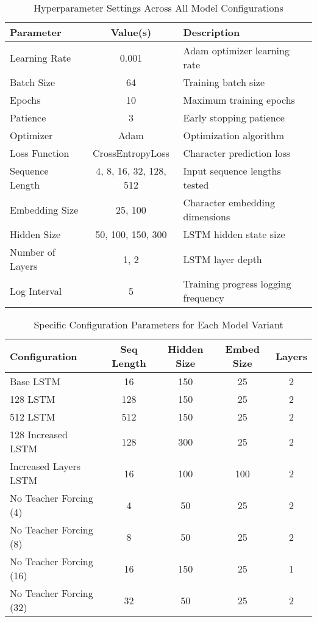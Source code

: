 \documentclass[12pt]{article}
\begin{document}
\begin{table}[h]
\centering
\begin{tabular}{|l|c|l|}
\hline
\textbf{Parameter} & \textbf{Value(s)} & \textbf{Description} \\
\hline
Learning Rate & 0.001 & Adam optimizer learning rate \\
Batch Size & 64 & Training batch size \\
Epochs & 10 & Maximum training epochs \\
Patience & 3 & Early stopping patience \\
Optimizer & Adam & Optimization algorithm \\
Loss Function & CrossEntropyLoss & Character prediction loss \\
Sequence Length & 4, 8, 16, 32, 128, 512 & Input sequence lengths tested \\
Embedding Size & 25, 100 & Character embedding dimensions \\
Hidden Size & 50, 100, 150, 300 & LSTM hidden state size \\
Number of Layers & 1, 2 & LSTM layer depth \\
Log Interval & 5 & Training progress logging frequency \\
\hline
\end{tabular}
\caption{Hyperparameter Settings Across All Model Configurations}
\label{tab:hyperparams}
\end{table}

\begin{table}[h]
\centering
\begin{tabular}{|l|c|c|c|c|}
\hline
\textbf{Configuration} & \textbf{Seq Length} & \textbf{Hidden Size} & \textbf{Embed Size} & \textbf{Layers} \\
\hline
Base LSTM & 16 & 150 & 25 & 2 \\
128 LSTM & 128 & 150 & 25 & 2 \\
512 LSTM & 512 & 150 & 25 & 2 \\
128 Increased LSTM & 128 & 300 & 25 & 2 \\
Increased Layers LSTM & 16 & 100 & 100 & 2 \\
No Teacher Forcing (4) & 4 & 50 & 25 & 2 \\
No Teacher Forcing (8) & 8 & 50 & 25 & 2 \\
No Teacher Forcing (16) & 16 & 150 & 25 & 1 \\
No Teacher Forcing (32) & 32 & 50 & 25 & 2 \\
\hline
\end{tabular}
\caption{Specific Configuration Parameters for Each Model Variant}
\label{tab:config_params}
\end{table}
\end{document}
